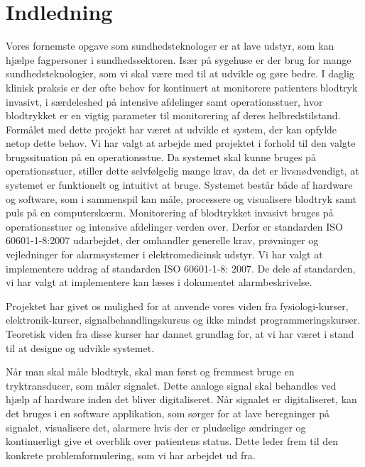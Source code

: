 \chapter{Indledning}
Vores fornemste opgave som sundhedsteknologer er at lave udstyr, som kan hjælpe fagpersoner
i sundhedssektoren. Især på sygehuse er der brug for mange sundhedsteknologier, som vi
skal være med til at udvikle og gøre bedre. I daglig klinisk praksis er der ofte behov for
kontinuert at monitorere patienters blodtryk invasivt, i særdeleshed på intensive afdelinger
samt operationsstuer, hvor blodtrykket er en vigtig parameter til monitorering af deres
helbredstilstand. Formålet med dette projekt har været at udvikle et system, der kan opfylde
netop dette behov. Vi har valgt at arbejde med projektet i forhold til den valgte brugssituation
på en operationsstue. Da systemet skal kunne bruges på operationsstuer, stiller dette selvfølgelig
mange krav, da det er livsnødvendigt, at systemet er funktionelt og intuitivt at bruge. Systemet
består både af hardware og software, som i sammenspil kan måle, processere og visualisere blodtryk
samt puls på en computerskærm. Monitorering af blodtrykket invasivt bruges på operationsstuer
og intensive afdelinger verden over. Derfor er standarden ISO 60601-1-8:2007 udarbejdet, der omhandler generelle krav, prøvninger og vejledninger for alarmsystemer i elektromedicinsk udstyr. 
Vi har valgt at implementere uddrag af standarden ISO 60601-1-8: 2007. De dele af standarden, vi har valgt at implementere kan læses i dokumentet alarmbeskrivelse. 

Projektet har givet os mulighed for at anvende vores viden fra fysiologi-kurser, elektronik-kurser,
signalbehandlingskursus og ikke mindst programmeringskurser. Teoretisk viden fra disse kurser
har dannet grundlag for, at vi har været i stand til at designe og udvikle systemet.

Når man skal måle blodtryk, skal man først og fremmest bruge en tryktransducer, som
måler signalet. Dette analoge signal skal behandles ved hjælp af hardware inden det bliver
digitaliseret. Når signalet er digitaliseret, kan det bruges i en software applikation, som sørger
for at lave beregninger på signalet, visualisere det, alarmere hvis der er pludselige ændringer og kontinuerligt give et overblik over patientens status. Dette leder frem til den konkrete
problemformulering, som vi har arbejdet ud fra.




